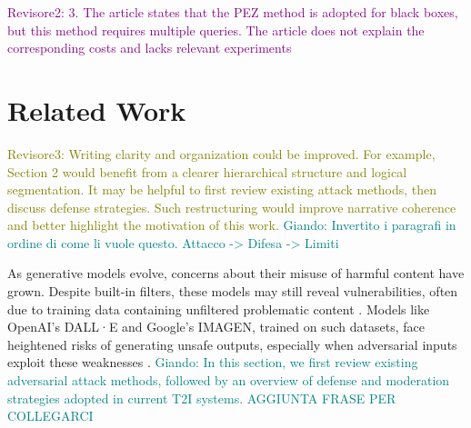 \documentclass[acmsmall]{acmart}
\newcommand{\dalle}{DALL·E\xspace}
\newcommand{\imagen}{IMAGEN\xspace}
\newcommand{\ste}[1]{\textcolor{red}{[Stefano: #1]}}
\newcommand{\giando}[1]{\textcolor{teal}{Giando: #1}}
\newcommand{\revtwo}[1]{\textcolor{purple}{Revisore2: #1}}
\newcommand{\revthree}[1]{\textcolor{olive}{Revisore3: #1}}
\begin{document}
\revtwo{3. The article states that the PEZ method is adopted for black boxes, but this method requires multiple queries. The article does not explain the corresponding costs and lacks relevant experiments}
\section{Related Work}\label{sec:related}
\revthree{Writing clarity and organization could be improved. For example, Section 2 would benefit from a clearer hierarchical structure and logical segmentation. It may be helpful to first review existing attack methods, then discuss defense strategies. Such restructuring would improve narrative coherence and better highlight the motivation of this work. }
\giando{Invertito i paragrafi in ordine di come li vuole questo. Attacco -> Difesa -> Limiti}







As generative models evolve, concerns about their misuse of harmful content have grown. Despite built-in filters, these models may still reveal vulnerabilities, often due to training data containing unfiltered problematic content \cite{rando2022red,NEURIPS2022_a1859deb}. Models like OpenAI's \dalle and Google's \imagen, trained on such datasets, face heightened risks of generating unsafe outputs, especially when adversarial inputs exploit these weaknesses \cite{schramowski2023safe}. \giando{In this section, we first review existing adversarial attack methods, followed by an overview of defense and moderation strategies adopted in current T2I systems. AGGIUNTA FRASE PER COLLEGARCI}

\end{document}
